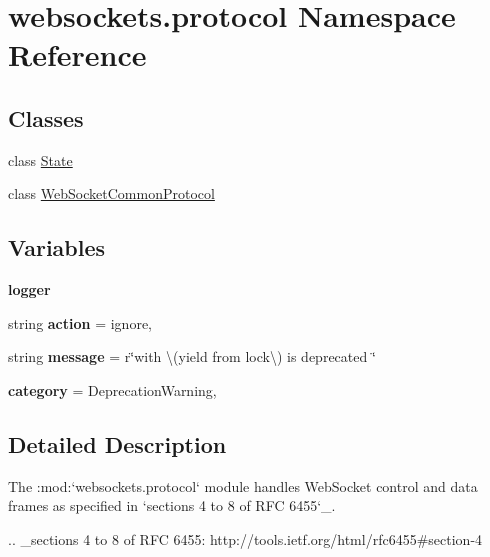 \hypertarget{namespacewebsockets_1_1protocol}{}\section{websockets.\+protocol Namespace Reference}
\label{namespacewebsockets_1_1protocol}
\subsection*{Classes}
\begin{DoxyCompactItemize}
\item 
class \hyperlink{classwebsockets_1_1protocol_1_1_state}{State}
\item 
class \hyperlink{classwebsockets_1_1protocol_1_1_web_socket_common_protocol}{Web\+Socket\+Common\+Protocol}
\end{DoxyCompactItemize}
\subsection*{Variables}
\begin{DoxyCompactItemize}
\item 
\mbox{\label{namespacewebsockets_1_1protocol_a30fcca1669df99c84fb8e2395bbd9b9e}} 
{\bfseries logger}
\item 
\mbox{\label{namespacewebsockets_1_1protocol_a8ffe29d416dd3eded4c7084362669d09}} 
string {\bfseries action} = \textquotesingle{}ignore\textquotesingle{},
\item 
\mbox{\label{namespacewebsockets_1_1protocol_ae70878a849ddc092a0c52c869bbf4a76}} 
string {\bfseries message} = r\char`\"{}\textquotesingle{}with \textbackslash{}(yield from lock\textbackslash{})\textquotesingle{} is deprecated \char`\"{}
\item 
\mbox{\label{namespacewebsockets_1_1protocol_abe8fd3cbbdd685678ba7e3671bb25513}} 
{\bfseries category} = Deprecation\+Warning,
\end{DoxyCompactItemize}


\subsection{Detailed Description}
\begin{DoxyVerb}The :mod:`websockets.protocol` module handles WebSocket control and data
frames as specified in `sections 4 to 8 of RFC 6455`_.

.. _sections 4 to 8 of RFC 6455: http://tools.ietf.org/html/rfc6455#section-4\end{DoxyVerb}
 